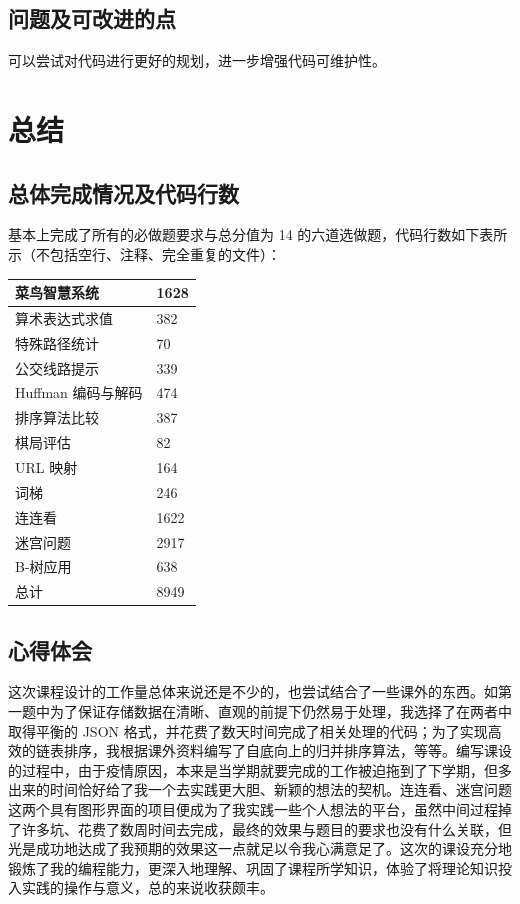 \documentclass[a4paper,UTF8]{ctexart}
\begin{document}
\subsection{问题及可改进的点}
可以尝试对代码进行更好的规划，进一步增强代码可维护性。

\section{总结}
\subsection{总体完成情况及代码行数}
基本上完成了所有的必做题要求与总分值为 14 的六道选做题，代码行数如下表所示（不包括空行、注释、完全重复的文件）：
\begin{table}[H]
\centering
\begin{tabular}{|l|l|}
    \hline
    菜鸟智慧系统 & 1628 \\
    \hline
    算术表达式求值 & 382 \\
    \hline
    特殊路径统计 & 70 \\
    \hline
    公交线路提示 & 339 \\
    \hline
    Huffman 编码与解码 & 474 \\
    \hline
    排序算法比较 & 387 \\
    \hline
    棋局评估 & 82 \\
    \hline
    URL 映射 & 164 \\
    \hline
    词梯 & 246 \\
    \hline
    连连看 & 1622 \\
    \hline
    迷宫问题 & 2917 \\
    \hline
    B-树应用 & 638 \\
    \hline
    总计 & 8949 \\
    \hline
\end{tabular}
\end{table}
\subsection{心得体会}
这次课程设计的工作量总体来说还是不少的，也尝试结合了一些课外的东西。如第一题中为了保证存储数据在清晰、直观的前提下仍然易于处理，我选择了在两者中取得平衡的 JSON 格式，并花费了数天时间完成了相关处理的代码；为了实现高效的链表排序，我根据课外资料编写了自底向上的归并排序算法，等等。编写课设的过程中，由于疫情原因，本来是当学期就要完成的工作被迫拖到了下学期，但多出来的时间恰好给了我一个去实践更大胆、新颖的想法的契机。连连看、迷宫问题这两个具有图形界面的项目便成为了我实践一些个人想法的平台，虽然中间过程掉了许多坑、花费了数周时间去完成，最终的效果与题目的要求也没有什么关联，但光是成功地达成了我预期的效果这一点就足以令我心满意足了。这次的课设充分地锻炼了我的编程能力，更深入地理解、巩固了课程所学知识，体验了将理论知识投入实践的操作与意义，总的来说收获颇丰。
\end{document}
